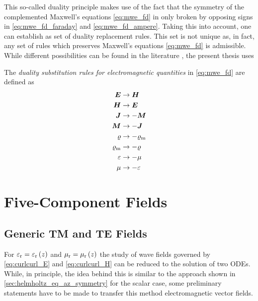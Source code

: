 This so-called duality principle makes use of the fact that the symmetry of the
complemented Maxwell's equations \eqref{eq:mwe_fd} in only broken by
opposing signs in \eqref{eq:mwe_fd_faraday} and \eqref{eq:mwe_fd_ampere}.
Taking this into account, one can establish as set of duality replacement rules.
This set is not unique as, in fact, any set of rules which preserves Maxwell's
equations \eqref{eq:mwe_fd} is admissible.
While different possibilities can be found in the literature
\cite{Jin2015,Harrington2001,Chew1999}, the present thesis uses
\begin{definition}
	The \emph{duality substitution rules for electromagnetic quantities} in
	\eqref{eq:mwe_fd} are defined as \cite[9]{Chew1999}
	\begin{subequations}
		\begin{align}
		\pvec{E} &\to \pvec{H} \\
		\pvec{H} &\to \pvec{E} \\
		\pvec{J} &\to -\pvec{M} \\
		\pvec{M} &\to -\pvec{J} \\
		\varrho &\to -\varrho_\mathrm{m} \\
		\varrho_\mathrm{m} &\to -\varrho \\
		\varepsilon &\to -\mu \\
		\mu &\to -\varepsilon 
		\end{align}
	\end{subequations}
\end{definition}











\section{Five-Component Fields}
\label{sec:five_component_fields}






\subsection{Generic \acs{TM} and \acs{TE} Fields}
\label{subsec:generic_TM_and_TE_fields}

For $\varepsilon_{\mathrm{r}} = \varepsilon_{\mathrm{r}}\left(z\right)$ and $\mu_{\mathrm{r}} = \mu_{\mathrm{r}}\left(z\right)$ the study of
wave fields governed by \eqref{eq:curlcurl_E} and \eqref{eq:curlcurl_H} can be
reduced to the solution of two \acp{ODE}.
While, in principle, the idea behind this is similar to the approach shown in
\cref{sec:helmholtz_eq_az_symmetry} for the scalar case, some preliminary
statements have to be made to transfer this method electromagnetic vector
fields.

